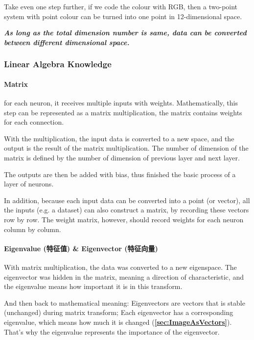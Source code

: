 \documentclass[a4paper, openany]{book}
\begin{document}
Take even one step further, if we code the colour with RGB, then a two-point system with point colour can be turned into one point in 12-dimensional space.

\textbf{\textit{As long as the total dimension number is same, data can be converted between different dimensional space.}}

\subsubsection{Linear Algebra Knowledge}

\paragraph{Matrix}

for each neuron, it receives multiple inputs with weights. Mathematically, this step can be represented as a matrix multiplication, the matrix contains weights for each connection.

With the multiplication, the input data is converted to a new space, and the output is the result of the matrix multiplication. The number of dimension of the matrix is defined by the number of dimension of previous layer and next layer.

The outputs are then be added with bias, thus finished the basic process of a layer of neurons.

In addition, because each input data can be converted into a point (or vector), all the inputs (e.g. a dataset) can also construct a matrix, by recording these vectors row by row. \label{DataToPoint1} The weight matrix, however, should record weights for each neuron column by column.

\paragraph{Eigenvalue (特征值) \& Eigenvector (特征向量)}

With matrix multiplication, the data was converted to a new eigenspace. The eigenvector was hidden in the matrix, meaning a direction of characteristic, and the eigenvalue means how important it is in this transform.

And then back to mathematical meaning: Eigenvectors are vectors that is stable (unchanged) during matrix transform; Each eigenvector has a corresponding eigenvalue, which means how much it is changed (\textbf{\cref{sec:ImageAsVectors}}). That's why the eigenvalue represents the importance of the eigenvector.
\end{document}
